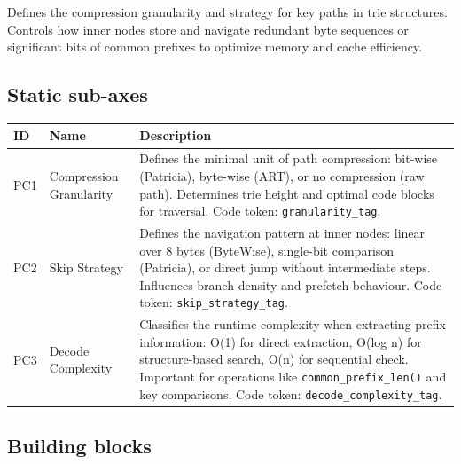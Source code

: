 Defines the compression granularity and strategy for key paths in trie structures. Controls how inner nodes store and navigate redundant byte sequences or significant bits of common prefixes to optimize memory and cache efficiency.

\subsection*{Static sub-axes}

\begin{scriptsize}
\begin{longtable}{@{}>{\raggedright\arraybackslash}p{1.8cm} >{\raggedright\arraybackslash}p{3.2cm} >{\raggedright\arraybackslash}p{8.5cm}@{}}
\toprule
ID & Name & Description \\
\midrule
\endhead%
PC1 & Compression Granularity & Defines the minimal unit of path compression: bit-wise (Patricia), byte-wise (ART), or no compression (raw path). Determines trie height and optimal code blocks for traversal. Code token: \texttt{granularity\_\allowbreak{}tag}. \\
PC2 & Skip Strategy & Defines the navigation pattern at inner nodes: linear over 8 bytes (Byte\allowbreak{}Wise), single-bit comparison (Patricia), or direct jump without intermediate steps. Influences branch density and prefetch behaviour. Code token: \texttt{skip\_\allowbreak{}strategy\_\allowbreak{}tag}. \\
PC3 & Decode Complexity & Classifies the runtime complexity when extracting prefix information: O(1) for direct extraction, O(log n) for structure-based search, O(n) for sequential check. Important for operations like \texttt{common\_\allowbreak{}prefix\_\allowbreak{}len()} and key comparisons. Code token: \texttt{decode\_\allowbreak{}complexity\_\allowbreak{}tag}. \\
\bottomrule
\end{longtable}
\end{scriptsize}

\subsection*{Building blocks}

